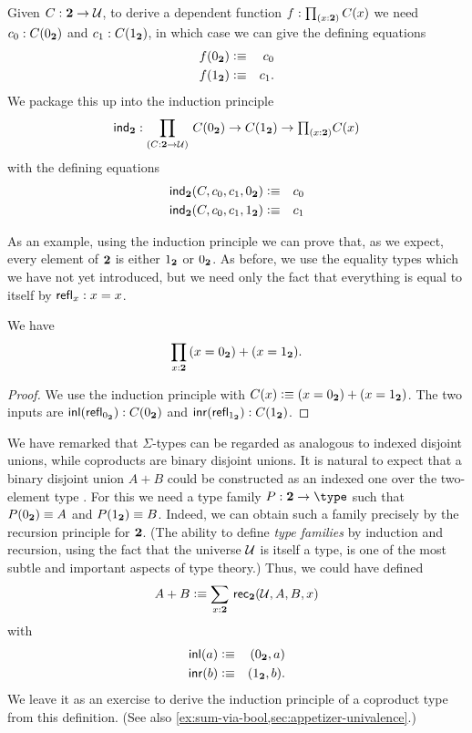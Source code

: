 Given $C : \mathbf{2} \to \mathcal{U}$, to derive a dependent function 
$f : \prd{x:\bool}C(x)$ we need $c_0:C({0_{\mathbf{2}}})$ and $c_1 : C({1_{\mathbf{2}}})$, in which case we can give the defining equations
\begin{eqnarray*}
  f({0_{\mathbf{2}}}) & \vcentcolon\equiv & c_0 \\
  f({1_{\mathbf{2}}}) & \vcentcolon\equiv & c_1.
\end{eqnarray*}
We package this up into the induction principle
\[ \ind{\bool} : \dprd{C:\bool \to \UU}  C(\bfalse) \to C(\btrue)
\to \tprd{x:\bool} C(x) \]
with the defining equations
\begin{eqnarray*}
  \mathsf{ind}_{\mathbf{2}}(C,c_0,c_1,{0_{\mathbf{2}}}) & \vcentcolon\equiv & c_0 \\
  \mathsf{ind}_{\mathbf{2}}(C,c_0,c_1,{1_{\mathbf{2}}}) & \vcentcolon\equiv & c_1
\end{eqnarray*}

As an example, using the induction principle we can prove that, as we expect, every element of $\mathbf{2}$ is either ${1_{\mathbf{2}}}$ or ${0_{\mathbf{2}}}$.
As before, we use the equality types which we have not yet introduced, but we need only the fact that everything is equal to itself by $\mathsf{refl}_{x}:x=x$.

\begin{thm}\label{thm:allbool-trueorfalse}
  We have
  \[ \prd{x:\bool}(x=\bfalse)+(x=\btrue). \]
\end{thm}
\begin{proof}
  We use the induction principle with $C(x) \vcentcolon\equiv (x={0_{\mathbf{2}}})+(x={1_{\mathbf{2}}})$.
  The two inputs are ${\mathsf{inl}}(\mathsf{refl}_{{0_{\mathbf{2}}}}) : C({0_{\mathbf{2}}})$ and ${\mathsf{inr}}(\mathsf{refl}_{{1_{\mathbf{2}}}}):C({1_{\mathbf{2}}})$.
\end{proof}

We have remarked that $\Sigma$-types can be regarded as analogous to indexed disjoint unions, while coproducts are binary disjoint unions.
It is natural to expect that a binary disjoint union $A+B$ could be constructed as an indexed one over the two-element type \bool.
For this we need a type family $P:\bool\to\type$ such that $P({0_{\mathbf{2}}})\equiv A$ and $P({1_{\mathbf{2}}})\equiv B$.
Indeed, we can obtain such a family precisely by the recursion principle for $\mathbf{2}$.
%
(The ability to define \emph{type families} by induction and recursion, using the fact that the universe $\mathcal{U}$ is itself a type, is one of the most subtle and important aspects of type theory.)
Thus, we could have defined
%
\[ A + B \defeq \sm{x:\bool} \rec{\bool}(\UU,A,B,x) \]
with
\begin{eqnarray*}
  {\mathsf{inl}}(a) & \vcentcolon\equiv & ({0_{\mathbf{2}}},a) \\
  {\mathsf{inr}}(b) & \vcentcolon\equiv & ({1_{\mathbf{2}}},b).
\end{eqnarray*}
We leave it as an exercise to derive the induction principle of a coproduct type from this definition.
(See also \autoref{ex:sum-via-bool,sec:appetizer-univalence}.)


